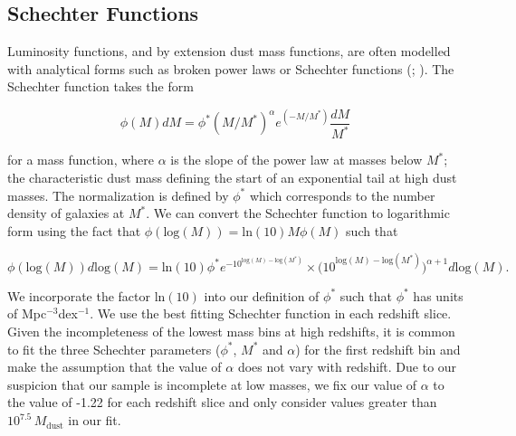 \subsection{Schechter Functions}

Luminosity functions, and by extension dust mass functions, are often modelled with analytical forms such as broken power laws or Schechter functions (\citealt{Press_1974}; \citealt{Schechter_1976}). The Schechter function takes the form

\begin{equation}
    \phi(M) dM = \phi^* (M/M^*)^\alpha e^{(-M/M^*)}\frac{dM}{M^*}
    \label{eq:schechter_function}
\end{equation}

\noindent for a mass function, where $\alpha$ is the slope of the power law at masses below $M^*$; the characteristic dust mass defining the start of an exponential tail at high dust masses. The normalization is defined by $\phi^*$ which corresponds to the number density of galaxies at $M^*$. We can convert the Schechter function to logarithmic form using the fact that $\phi(\textrm{log}(M)) = \textrm{ln}(10)M\phi(M)$ such that

\begin{equation}
    \phi(\textrm{log}(M)) d\textrm{log}(M) = \textrm{ln}(10)\phi^* e^{-10^{\textrm{log}(M)-\textrm{log}(M^*)}}\times \Bigg(10^{\textrm{log}(M)-\textrm{log}(M^*)}\Bigg)^{\alpha+1} d\textrm{log}(M).
    \label{eq:schechter_function_log}
\end{equation}

We incorporate the factor $\textrm{ln}(10)$ into our definition of $\phi^*$ such that $\phi^*$ has units of Mpc$^{-3}$dex$^{-1}$. We use the best fitting Schechter function in each redshift slice. Given the incompleteness of the lowest mass bins at high redshifts, it is common to fit the three Schechter parameters ($\phi^*$, $M^*$ and $\alpha$) for the first redshift bin and make the assumption that the value of $\alpha$ does not vary with redshift. Due to our suspicion that our sample is incomplete at low masses, we fix our value of $\alpha$ to the \citealt{Beeston_2018} value of -1.22 for each redshift slice and only consider values greater than $10^{7.5}\,M_{\textrm{dust}}$ in our fit.

